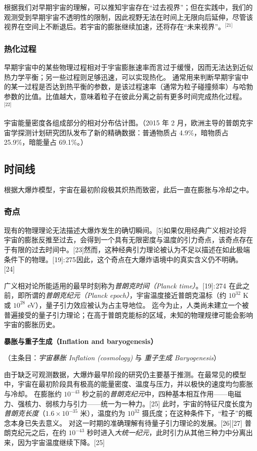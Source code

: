 根据我们对早期宇宙的理解，可以推知宇宙存在“过去视界”；但在实践中，我们的观测受到早期宇宙不透明性的限制，因此视野无法在时间上无限向后延伸，尽管该视界在空间上不断退后。若宇宙的膨胀继续加速，还将存在“未来视界”。\(^\text{[21]}\)
\subsubsection{热化过程}
早期宇宙中的某些物理过程相对于宇宙膨胀速率而言过于缓慢，因而无法达到近似热力学平衡；另一些过程则足够迅速，可以实现热化。  
通常用来判断早期宇宙中的某一过程是否达到热平衡的参数，是该过程速率（通常为粒子碰撞频率）与哈勃参数的比值。比值越大，意味着粒子在彼此分离之前有更多时间完成热化过程。\(^\text{[22]}\)

宇宙能量密度各组成部分的相对分布估计图。（2015 年 2 月，欧洲主导的普朗克宇宙学探测计划研究团队发布了新的精确数据：普通物质占 4.9\%，暗物质占 25.9\%，暗能量占 69.1\%。）
\subsection{时间线}
根据大爆炸模型，宇宙在最初阶段极其炽热而致密，此后一直在膨胀与冷却之中。
\subsubsection{奇点}
现有的物理理论无法描述大爆炸发生的确切瞬间。[5]如果仅用经典广义相对论将宇宙的膨胀反推至过去，会得到一个具有无限密度与温度的引力奇点，该奇点存在于有限的过去时间中。[23]然而，这种经典引力理论被认为不足以描述在如此极端条件下的物理。[19]: 275 因此，这个奇点在大爆炸语境中的真实含义仍不明确。[24]

广义相对论所能适用的最早时刻称为\emph{普朗克时间（Planck time）}。[19]: 274   
在此之前，即所谓的\emph{普朗克纪元（Planck epoch）}，宇宙温度接近普朗克温标（约 $10^{32}$ K 或 $10^{28}$ eV），量子引力效应被认为占主导地位。  
迄今为止，人类尚未建立一个被普遍接受的量子引力理论；在高于普朗克能标的区域，未知的物理规律可能会影响宇宙的膨胀历史。

\textbf{暴胀与重子生成（Inflation and baryogenesis）}

（主条目：\emph{宇宙暴胀 Inflation (cosmology)} 与 \emph{重子生成 Baryogenesis}）

由于缺乏可观测数据，大爆炸最早阶段的研究仍主要基于推测。在最常见的模型中，宇宙在最初阶段具有极高的能量密度、温度与压力，并以极快的速度均匀膨胀与冷却。  
在膨胀约 $10^{-43}$ 秒之前的\emph{普朗克纪元}中，四种基本相互作用——电磁力、强核力、弱核力与引力——统一为一种力。[25]  
此时，宇宙的特征尺度长度为\emph{普朗克长度}（$1.6\times10^{-35}$ 米），温度约为 $10^{32}$ 摄氏度；在这种条件下，“粒子”的概念本身已失去意义。  
对这一时期的准确理解有待量子引力理论的发展。[26][27]  
普朗克纪元之后，在约 $10^{-43}$ 秒时进入\emph{大统一纪元}，此时引力从其他三种力中分离出来，因为宇宙温度继续下降。[25]

